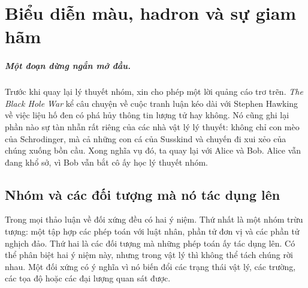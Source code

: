 \chapter{Biểu diễn màu, hadron và sự giam hãm}

\paragraph{Một đoạn dừng ngắn mở đầu.}
Trước khi quay lại lý thuyết nhóm, xin cho phép một lời quảng cáo trơ trẽn. \emph{The
Black Hole War} kể câu chuyện về cuộc tranh luận kéo dài với Stephen Hawking về việc liệu hố đen có phá hủy thông tin lượng tử hay không. Nó cũng ghi lại phần nào sự tàn nhẫn rất riêng của các nhà vật lý lý thuyết: không chỉ con mèo của Schrodinger, mà cả những con cá của Susskind và chuyến đi xui xẻo của chúng xuống bồn cầu. Xong nghĩa vụ đó, ta quay lại với Alice và Bob. Alice vẫn đang khổ sở, vì Bob vẫn bắt cô ấy học lý thuyết nhóm.


\section{Nhóm và các đối tượng mà nó tác dụng lên}

Trong mọi thảo luận về đối xứng đều có hai ý niệm. Thứ nhất là một nhóm trừu tượng: một tập hợp các phép toán với luật nhân, phần tử đơn vị và các phần tử nghịch đảo. Thứ hai là các đối tượng mà những phép toán ấy tác dụng lên. Có thể phân biệt hai ý niệm này, nhưng trong vật lý thì không thể tách chúng rời nhau. Một đối xứng có ý nghĩa vì nó biến đổi các trạng thái vật lý, các trường, các tọa độ hoặc các đại lượng quan sát được.

\begin{classroomqa}
\end{classroomqa}

